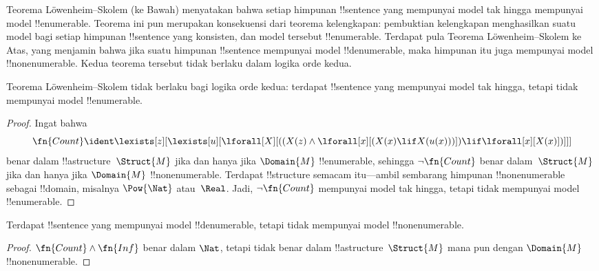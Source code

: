 \documentclass[../../../include/open-logic-section]{subfiles}
\begin{document}


\begin{explain}
Teorema L\"owenheim--Skolem (ke Bawah) menyatakan bahwa setiap himpunan
!!{sentence} yang mempunyai model tak hingga mempunyai model
!!{enumerable}. Teorema ini pun merupakan konsekuensi dari teorema
kelengkapan: pembuktian kelengkapan menghasilkan suatu model bagi setiap
himpunan !!{sentence} yang konsisten, dan model tersebut !!{enumerable}.
Terdapat pula Teorema L\"owenheim--Skolem ke Atas, yang menjamin bahwa jika
suatu himpunan !!{sentence} mempunyai model !!{denumerable}, maka himpunan
itu juga mempunyai model !!{nonenumerable}. Kedua teorema tersebut tidak
berlaku dalam logika orde kedua.
\end{explain}


\begin{thm}
 Teorema L\"owenheim--Skolem tidak berlaku bagi
logika orde kedua: terdapat !!{sentence} yang mempunyai model tak hingga,
tetapi tidak mempunyai model !!{enumerable}.
\end{thm}

\begin{proof}
Ingat bahwa
\[
\fn{Count} \ident \lexists[z][\lexists[u][\lforall[X][((X(z) \land
      \lforall[x][(X(x) \lif X(u(x)))]) \lif \lforall[x][X(x)])]]]
\]
benar dalam !!a{structure}~$\Struct{M}$ jika dan hanya jika $\Domain{M}$
!!{enumerable}, sehingga $\lnot\fn{Count}$ benar dalam~$\Struct{M}$ jika dan
hanya jika $\Domain{M}$ !!{nonenumerable}. Terdapat !!{structure} semacam
itu---ambil sembarang himpunan !!{nonenumerable} sebagai !!{domain}, misalnya
$\Pow{\Nat}$ atau~$\Real$. Jadi, $\lnot \fn{Count}$ mempunyai model tak
hingga, tetapi tidak mempunyai model !!{enumerable}.
\end{proof}

\begin{thm}
Terdapat !!{sentence} yang mempunyai model !!{denumerable}, tetapi tidak
mempunyai model !!{nonenumerable}.
\end{thm}

\begin{proof}
$\fn{Count} \land \fn{Inf}$ benar dalam $\Nat$, tetapi tidak benar dalam
  !!a{structure}~$\Struct{M}$ mana pun dengan $\Domain{M}$
!!{nonenumerable}.
\end{proof}
\end{document}
